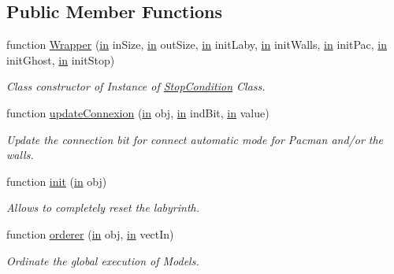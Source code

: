 \subsection*{Public Member Functions}
\begin{DoxyCompactItemize}
\item 
function \hyperlink{class_wrapper_a0c4ac2d5799421f3db8cc95c90ffbde9}{Wrapper} (\hyperlink{class_wrapper_a5e252d97ca5bf85c5753e2914673eead}{in} in\+Size, \hyperlink{class_wrapper_a5e252d97ca5bf85c5753e2914673eead}{in} out\+Size, \hyperlink{class_wrapper_a5e252d97ca5bf85c5753e2914673eead}{in} init\+Laby, \hyperlink{class_wrapper_a5e252d97ca5bf85c5753e2914673eead}{in} init\+Walls, \hyperlink{class_wrapper_a5e252d97ca5bf85c5753e2914673eead}{in} init\+Pac, \hyperlink{class_wrapper_a5e252d97ca5bf85c5753e2914673eead}{in} init\+Ghost, \hyperlink{class_wrapper_a5e252d97ca5bf85c5753e2914673eead}{in} init\+Stop)
\begin{DoxyCompactList}\small\item\em Class constructor of Instance of \hyperlink{class_stop_condition}{Stop\+Condition} Class. \end{DoxyCompactList}\item 
function \hyperlink{class_wrapper_aa41b9b215897635f48e1c8a4eaca7640}{update\+Connexion} (\hyperlink{class_wrapper_a5e252d97ca5bf85c5753e2914673eead}{in} obj, \hyperlink{class_wrapper_a5e252d97ca5bf85c5753e2914673eead}{in} ind\+Bit, \hyperlink{class_wrapper_a5e252d97ca5bf85c5753e2914673eead}{in} value)
\begin{DoxyCompactList}\small\item\em Update the connection bit for connect automatic mode for Pacman and/or the walls. \end{DoxyCompactList}\item 
function \hyperlink{class_wrapper_a7d486dd79e7c7bc857ffaa4e273d27c5}{init} (\hyperlink{class_wrapper_a5e252d97ca5bf85c5753e2914673eead}{in} obj)
\begin{DoxyCompactList}\small\item\em Allows to completely reset the labyrinth. \end{DoxyCompactList}\item 
function \hyperlink{class_wrapper_a9c889c73b9d4b80dde64dfe385ed747e}{orderer} (\hyperlink{class_wrapper_a5e252d97ca5bf85c5753e2914673eead}{in} obj, \hyperlink{class_wrapper_a5e252d97ca5bf85c5753e2914673eead}{in} vect\+In)
\begin{DoxyCompactList}\small\item\em Ordinate the global execution of Models. \end{DoxyCompactList}\item 

\end{DoxyCompactItemize}
